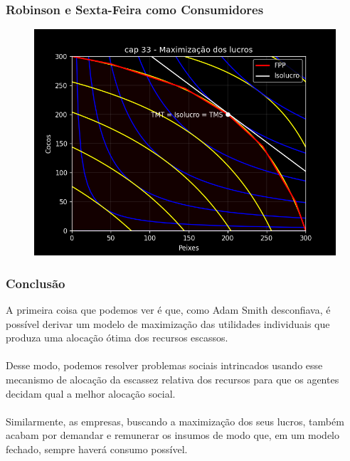\documentclass{beamer}[10]
\begin{document}
\begin{frame}
	\frametitle{Robinson e Sexta-Feira como Consumidores}

	\begin{figure}[H]
		\centering
		\includegraphics[scale=0.6]{cap33_13-equilibrio_geral.png}
	\end{figure}

\end{frame}

\begin{frame}
	\frametitle{Conclusão}

	A primeira coisa que podemos ver é que, como Adam Smith desconfiava, é possível derivar um modelo de maximização das utilidades individuais que produza uma alocação ótima dos recursos escassos.
	\\~\\
	Desse modo, podemos resolver problemas sociais intrincados usando esse mecanismo de alocação da escassez relativa dos recursos para que os agentes decidam qual a melhor alocação social.
	\\~\\
	Similarmente, as empresas, buscando a maximização dos seus lucros, também acabam por demandar e remunerar os insumos de modo que, em um modelo fechado, sempre haverá consumo possível.

\end{frame}

\end{document}
